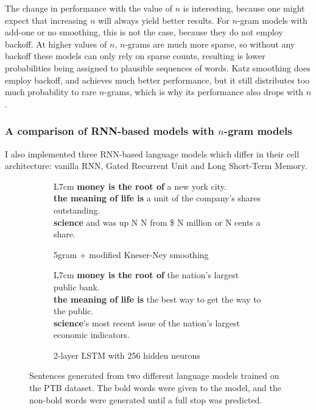 \documentclass[a4paper, 12pt]{report}
\newcommand{\tbf}[1]{\textbf{#1}}
\begin{document}
The change in performance with the value of $n$ is interesting, because one might expect that increasing $n$ will always yield better results. For $n$-gram models with add-one or no smoothing, this is not the case, because they do not employ backoff. At higher values of $n$, $n$-grams are much more sparse, so without any backoff these models can only rely on sparse counts, resulting is lower probabilities being assigned to plausible sequences of words. Katz smoothing does employ backoff, and achieves much better performance, but it still distributes too much probability to rare $n$-grams, which is why its performance also drops with $n$.

\subsubsection*{A comparison of RNN-based models with $n$-gram models}

I also implemented three RNN-based language models which differ in their cell architecture: vanilla RNN, Gated Recurrent Unit and Long Short-Term Memory. \\

\begin{figure}[h]
\captionsetup{justification=centering}
\centering
\begin{subfigure}{0.5\linewidth}
	\centering
	\begin{tabular}{L{7cm}}
		\hline
		\tbf{money is the root of} a new york city. \\ \hline
		\tbf{the meaning of life is} a unit of the company's shares outstanding. \\ \hline
		\tbf{science} and was up N N from \$ N million or N cents a share. \\ \hline
	\end{tabular}
	\caption{5gram + modified Kneser-Ney smoothing}
\end{subfigure}%
\begin{subfigure}{0.5\linewidth}
	\centering
	\begin{tabular}{L{7cm}}
		\hline
		\tbf{money is the root of} the nation's largest public bank. \\ \hline
		\tbf{the meaning of life is} the best way to get the way to the public. \\ \hline
		\tbf{science}'s most recent issue of the nation's largest economic indicators. \\ \hline
	\end{tabular}
	\caption{2-layer LSTM with 256 hidden neurons}
\end{subfigure}
\caption{Sentences generated from two different language models trained on the PTB dataset. The bold words were given to the model, and the non-bold words were generated until a full stop was predicted.}
\label{fig:generated_sentences}
\end{figure}
\end{document}
